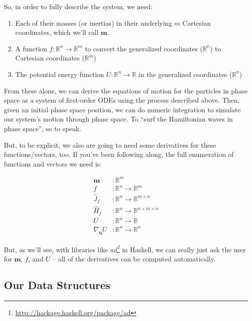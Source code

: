 \documentclass[]{article}
\renewcommand{\href}[2]{#2\footnote{\url{#1}}}
\begin{document}
So, in order to fully describe the system, we need:

\begin{enumerate}
\def\labelenumi{\arabic{enumi}.}
\tightlist
\item
  Each of their masses (or inertias) in their underlying \(m\) Cartesian
  coordinates, which we'll call \(\mathbf{m}\).
\item
  A function \(f : \mathbb{R}^n \rightarrow \mathbb{R}^m\) to convert the
  generalized coordinates (\(\mathbb{R^n}\)) to Cartesian coordinates
  (\(\mathbb{R}^m\))
\item
  The potential energy function \(U : \mathbb{R}^n \rightarrow \mathbb{R}\) in
  the generalized coordinates (\(\mathbb{R^n}\))
\end{enumerate}

From these alone, we can derive the equations of motion for the particles in
phase space as a system of first-order ODEs using the process described above.
Then, given an initial phase space position, we can do numeric integration to
simulate our system's motion through phase space. To ``surf the Hamiltonian
waves in phase space'', so to speak.

But, to be explicit, we also are going to need some derivatives for these
functions/vectors, too. If you've been following along, the full enumeration of
functions and vectors we need is:

\[
\begin{aligned}
\mathbf{m} & : \mathbb{R}^m \\
f & : \mathbb{R}^n \rightarrow \mathbb{R}^m \\
\hat{J}_f & : \mathbb{R}^n \rightarrow \mathbb{R}^{m \times n} \\
\hat{H}_f & : \mathbb{R}^n \rightarrow \mathbb{R}^{n \times m \times n} \\
U & : \mathbb{R}^n \rightarrow \mathbb{R} \\
\nabla_{\mathbf{q}} U & : \mathbb{R}^n \rightarrow \mathbb{R}^n
\end{aligned}
\]

But, as we'll see, with libraries like
\emph{\href{http://hackage.haskell.org/package/ad}{ad}} in Haskell, we can
really just ask the user for \(\mathbf{m}\), \(f\), and \(U\) -- all of the
derivatives can be computed automatically.

\subsection{Our Data Structures}\label{our-data-structures}
\end{document}
